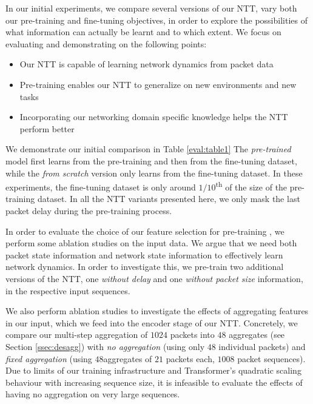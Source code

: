 In our initial experiments, we compare several versions of our NTT, vary both our pre-training and fine-tuning objectives, in order to explore the possibilities of what information can actually be learnt and to which extent. We focus on evaluating and demonstrating on the following points:

\begin{itemize}
\item Our NTT is capable of learning network dynamics from packet data 
\item Pre-training enables our NTT to generalize on new environments and new tasks 
\item Incorporating our networking domain specific knowledge helps the NTT perform better
\end{itemize}

We demonstrate our initial comparison in Table \ref{eval:table1} The \emph{pre-trained} model first learns from the pre-training and then from the fine-tuning dataset, while the \emph{from scratch} version only learns from the fine-tuning dataset. In these experiments, the fine-tuning dataset is only around $1/10$\textsuperscript{th} of the size of the pre-training dataset. In all the NTT variants presented here, we only mask the last packet delay during the pre-training process.

In order to evaluate the choice of our feature selection for pre-training , we perform some ablation studies on the input data. We argue that we need both packet state information and network state information to effectively learn network dynamics. In order to investigate this, we pre-train two additional versions of the NTT, one \emph{without delay} and one \emph{without packet size} information, in the respective input sequences.

We also perform ablation studies to investigate the effects of aggregating features in our input, which we feed into the encoder stage of our NTT. Concretely, we compare our multi-step aggregation of $1024$ packets into $48$ aggregates (see Section \ref{ssec:desagg}) with \emph{no aggregation} (using only $48$ individual packets) and \emph{fixed aggregation} (using $48 $aggregates of $21$ packets each, \ie $1008$ packet sequences). Due to limits of our training infrastructure and Transformer's quadratic scaling behaviour with increasing sequence size, it is infeasible to evaluate the effects of having no aggregation on very large sequences.



